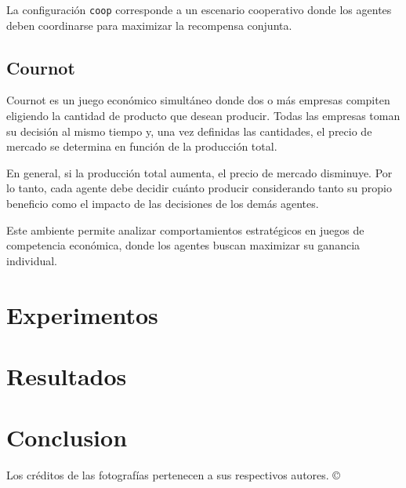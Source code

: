 \documentclass[letterpaper,12pt]{article} %
\begin{document}
La configuración \texttt{coop} corresponde a un escenario cooperativo donde los agentes deben coordinarse para maximizar la recompensa conjunta.


\subsection{Cournot}

Cournot es un juego económico simultáneo donde dos o más empresas compiten eligiendo la cantidad de producto que desean producir. Todas las empresas toman su decisión al mismo tiempo y, una vez definidas las cantidades, el precio de mercado se determina en función de la producción total.

En general, si la producción total aumenta, el precio de mercado disminuye. Por lo tanto, cada agente debe decidir cuánto producir considerando tanto su propio beneficio como el impacto de las decisiones de los demás agentes.

Este ambiente permite analizar comportamientos estratégicos en juegos de competencia económica, donde los agentes buscan maximizar su ganancia individual.



\section{Experimentos}



\section{Resultados}



\section{Conclusion}


            \nocite{*}
            
            


\centering \small Los créditos de las fotografías pertenecen a sus respectivos autores. ©

\centering\vspace*{\fill} 
\end{document}
